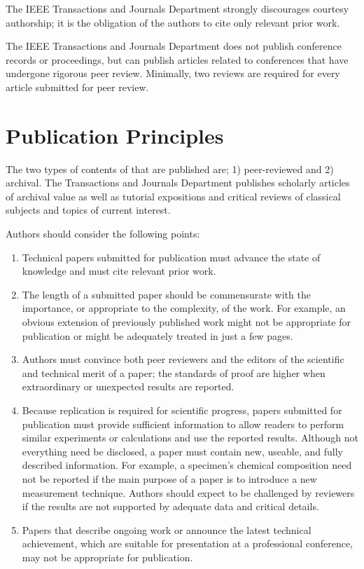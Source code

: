 \documentclass[journal,twoside,web]{ieeecolor2}
\begin{document}
The IEEE Transactions and Journals Department strongly discourages courtesy 
authorship; it is the obligation of the authors to cite only relevant prior 
work.

The IEEE Transactions and Journals Department does not publish conference 
records or proceedings, but can publish articles related to conferences that 
have undergone rigorous peer review.
Minimally, two reviews are required for 
every article submitted for peer review.

\section{Publication Principles}
The two types of contents of that are published are; 1) peer-reviewed and 2) 
archival.
The Transactions and Journals Department publishes scholarly 
articles of archival value as well as tutorial expositions and critical 
reviews of classical subjects and topics of current interest.


Authors should consider the following points:

\begin{enumerate}
\item Technical papers submitted for publication must advance the state of knowledge and must cite relevant prior work.

\item The length of a submitted paper should be commensurate with the importance, or appropriate to the complexity, of the work.
For example, an obvious extension of previously published work might not be appropriate for publication or might be adequately treated in just a few pages.
\item Authors must convince both peer reviewers and the editors of the scientific and technical merit of a paper; the standards of proof are higher when extraordinary or unexpected results are reported.

\item Because replication is required for scientific progress, papers submitted for publication must provide sufficient information to allow readers to perform similar experiments or calculations and 
use the reported results.
Although not everything need be disclosed, a paper 
must contain new, useable, and fully described information.
For example, a 
specimen's chemical composition need not be reported if the main purpose of 
a paper is to introduce a new measurement technique.
Authors should expect 
to be challenged by reviewers if the results are not supported by adequate 
data and critical details.
\item Papers that describe ongoing work or announce the latest technical achievement, which are suitable for presentation at a professional conference, may not be appropriate for publication.
\end{enumerate}
\end{document}

